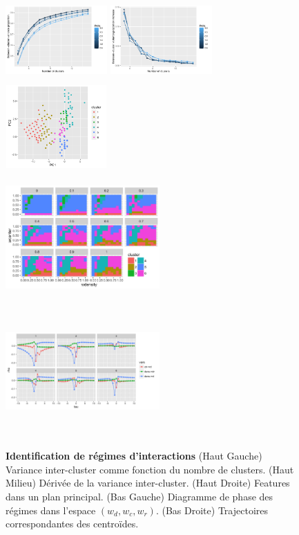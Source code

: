\documentclass[french]{./sageo}
\begin{document}
\begin{figure}[h]
\centering
\includegraphics[width=3.9cm,height=3.2cm]{figures/ccoef-knum_valuesFALSE_theta05-3.pdf}
\includegraphics[width=3.9cm,height=3.2cm]{figures/dccoef-knum_valuesFALSEtheta05-3.pdf}
\includegraphics[width=3.9cm,height=3.2cm]{figures/clusters-PCA-features_valuesFALSEtheta2_k6}\\
\includegraphics[width=5.9cm,height=5cm]{figures/clusters-paramfacet_valuesFALSEtheta2_k6}
\includegraphics[width=5.9cm,height=5cm]{figures/clusters-centertrajs-facetclust_valuesFALSEtheta2_k6}
\caption{\textbf{Identification de régimes d'interactions} (Haut Gauche) Variance inter-cluster comme fonction du nombre de clusters. (Haut Milieu) Dérivée de la variance inter-cluster. (Haut Droite) Features dans un plan principal. (Bas Gauche) Diagramme de phase des régimes dans l'espace $(w_{d},w_{c},w_{r})$. (Bas Droite) Trajectoires correspondantes des centroïdes.}
\label{fig:clustering}
\end{figure}
\end{document}
